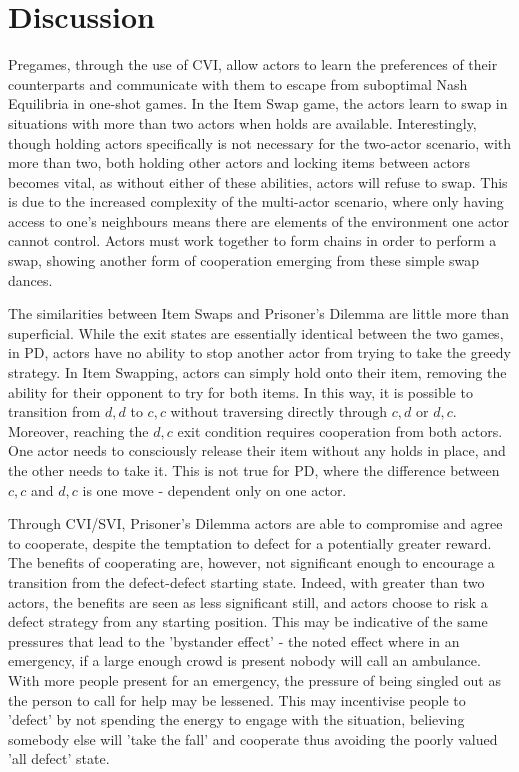 \chapter{Discussion}\label{C:dsc}

Pregames, through the use of CVI, allow actors to learn the preferences of their counterparts and communicate with them to escape from suboptimal Nash Equilibria in one-shot games. In the Item Swap game, the actors learn to swap in situations with more than two actors when holds are available. Interestingly, though holding actors specifically is not necessary for the two-actor scenario, with more than two, both holding other actors and locking items between actors becomes vital, as without either of these abilities, actors will refuse to swap. This is due to the increased complexity of the multi-actor scenario, where only having access to one's neighbours means there are elements of the environment one actor cannot control. Actors must work together to form chains in order to perform a swap, showing another form of cooperation emerging from these simple swap dances.

The similarities between Item Swaps and Prisoner's Dilemma are little more than superficial. While the exit states are essentially identical between the two games, in PD, actors have no ability to stop another actor from trying to take the greedy strategy. In Item Swapping, actors can simply hold onto their item, removing the ability for their opponent to try for both items. In this way, it is possible to transition from $d,d$ to $c,c$ without traversing directly through $c,d$ or $d,c$. Moreover, reaching the $d,c$ exit condition requires cooperation from both actors. One actor needs to consciously release their item without any holds in place, and the other needs to take it. This is not true for PD, where the difference between $c,c$ and $d,c$ is one move - dependent only on one actor.

Through CVI/SVI, Prisoner's Dilemma actors are able to compromise and agree to cooperate, despite the temptation to defect for a potentially greater reward. The benefits of cooperating are, however, not significant enough to encourage a transition from the defect-defect starting state. Indeed, with greater than two actors, the benefits are seen as less significant still, and actors choose to risk a defect strategy from any starting position. This may be indicative of the same pressures that lead to the 'bystander effect' \cite{fischer2011bystander} - the noted effect where in an emergency, if a large enough crowd is present nobody will call an ambulance. With more people present for an emergency, the pressure of being singled out as the person to call for help may be lessened. This may incentivise people to 'defect' by not spending the energy to engage with the situation, believing somebody else will 'take the fall' and cooperate thus avoiding the poorly valued 'all defect' state.

